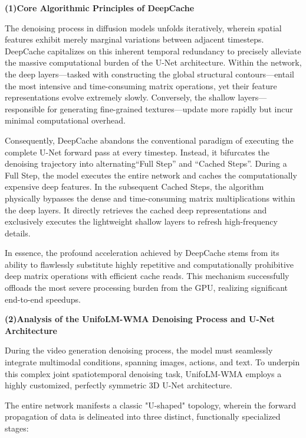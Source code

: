 \textbf{(1)Core Algorithmic Principles of DeepCache}

The denoising process in diffusion models unfolds iteratively, wherein spatial features exhibit merely marginal variations between adjacent timesteps. DeepCache capitalizes on this inherent temporal redundancy to precisely alleviate the massive computational burden of the U-Net architecture. Within the network, the deep layers—tasked with constructing the global structural contours—entail the most intensive and time-consuming matrix operations, yet their feature representations evolve extremely slowly. Conversely, the shallow layers—responsible for generating fine-grained textures—update more rapidly but incur minimal computational overhead.

Consequently, DeepCache abandons the conventional paradigm of executing the complete U-Net forward pass at every timestep. Instead, it bifurcates the denoising trajectory into alternating``Full Step'' and ``Cached Steps''. During a Full Step, the model executes the entire network and caches the computationally expensive deep features. In the subsequent Cached Steps, the algorithm physically bypasses the dense and time-consuming matrix multiplications within the deep layers. It directly retrieves the cached deep representations and exclusively executes the lightweight shallow layers to refresh high-frequency details.

In essence, the profound acceleration achieved by DeepCache stems from its ability to flawlessly substitute highly repetitive and computationally prohibitive deep matrix operations with efficient cache reads. This mechanism successfully offloads the most severe processing burden from the GPU, realizing significant end-to-end speedups.

\textbf{(2)Analysis of the UnifoLM-WMA Denoising Process and U-Net Architecture}  

During the video generation denoising process, the model must seamlessly integrate multimodal conditions, spanning images, actions, and text. To underpin this complex joint spatiotemporal denoising task, UnifoLM-WMA employs a highly customized, perfectly symmetric 3D U-Net architecture.

The entire network manifests a classic "U-shaped" topology, wherein the forward propagation of data is delineated into three distinct, functionally specialized stages:

